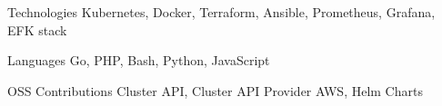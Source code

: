 


\begin{cvskills}


\cvskill
{Technologies} %
{Kubernetes, Docker, Terraform, Ansible, Prometheus, Grafana, EFK stack} %


\cvskill
{Languages} %
{Go, PHP, Bash, Python, JavaScript}


\cvskill
{OSS Contributions} %
{Cluster API, Cluster API Provider AWS, Helm Charts}


\end{cvskills}
